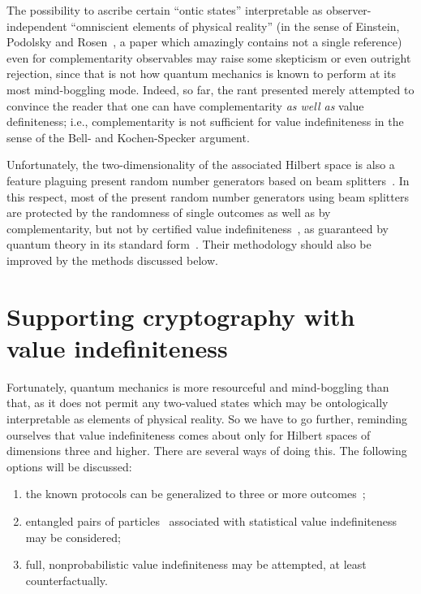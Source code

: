 \documentclass[%
 preprint,
 showpacs,
 showkeys,
 preprintnumbers,
 amsmath,amssymb,
 aps,
 pra,
  longbibliography,
 ]{revtex4-1}
\begin{document}
The possibility to ascribe certain ``ontic states'' interpretable as observer-independent
``omniscient elements of physical reality''
(in the sense of Einstein, Podolsky and Rosen~\cite[p.~777]{epr},
a paper which amazingly contains not a single reference) even for complementarity observables
may raise some skepticism or even outright rejection,
since that is not how quantum mechanics is known to perform at its most mind-boggling mode.
Indeed, so far, the rant presented merely attempted to convince the reader that one can
have complementarity {\em as well as} value definiteness; i.e.,
complementarity is not sufficient for value indefiniteness in the
sense of the Bell- and Kochen-Specker argument.

Unfortunately, the two-dimensionality of the associated Hilbert space
is also a feature
plaguing present random number generators based on beam
splitters~\cite{svozil-qct,rarity-94,zeilinger:qct,stefanov-2000}.
In this respect, most of the present random number generators using
beam splitters are protected by the randomness
of single outcomes as well as by complementarity, but not by
certified value indefiniteness~\cite{PhysRevLett.85.3313,2008-cal-svo,svozil-2009-howto,10.1038/nature09008},
as guaranteed by quantum theory in its standard form~\cite{v-neumann-49}.
Their methodology should also be improved by the methods discussed below.



\section{Supporting cryptography with value indefiniteness}

Fortunately, quantum mechanics is more resourceful and mind-boggling than that,
as it does not permit any two-valued states which may be ontologically  interpretable
as elements of physical reality.
So we have to go further, reminding ourselves that value indefiniteness
comes about only for Hilbert spaces of dimensions three and higher.
There are several ways of doing this.
The following options will be discussed:
\begin{enumerate}
\item
the known protocols can be generalized to three or more outcomes~\cite{PhysRevLett.85.3313};
\item
entangled pairs of particles~\cite{ekert91} associated with statistical value indefiniteness may be considered;
\item
full, nonprobabilistic value indefiniteness may be attempted, at least counterfactually.
\end{enumerate}
\end{document}
